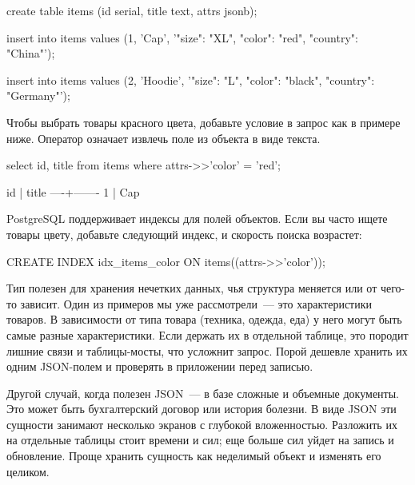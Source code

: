 \begin{english}
  \begin{sql}
create table items (id serial, title text, attrs jsonb);

insert into items values
  (1, 'Cap', '{"size": "XL", "color": "red", "country": "China"}');

insert into items values
  (2, 'Hoodie', '{"size": "L", "color": "black", "country": "Germany"}');
  \end{sql}
\end{english}

Чтобы выбрать товары красного цвета, добавьте условие в запрос как в примере ниже. Оператор \code{->>} означает извлечь поле  из объекта в виде текста.

\begin{english}
  \begin{sql}
select id, title from items where attrs->>'color' = 'red';

 id | title
----+-------
  1 | Cap
  \end{sql}
\end{english}

PostgreSQL поддерживает индексы для полей объектов. Если вы часто ищете товары цвету, добавьте следующий индекс, и скорость поиска возрастет:

\begin{english}
  \begin{clojure}
CREATE INDEX idx_items_color ON items((attrs->>'color'));
  \end{clojure}
\end{english}

Тип  полезен для хранения нечетких данных, чья структура меняется или от чего-то зависит. Один из примеров мы уже рассмотрели~--- это характеристики товаров. В зависимости от типа товара (техника, одежда, еда) у него могут быть самые разные характеристики. Если держать их в отдельной таблице, это породит лишние связи и таблицы-мосты, что усложнит запрос. Порой дешевле хранить их одним JSON-полем и проверять в приложении перед записью.

Другой случай, когда полезен JSON~--- в базе сложные и объемные документы. Это может быть бухгалтерский договор или история болезни. В виде JSON эти сущности занимают несколько экранов с глубокой вложенностью. Разложить их на отдельные таблицы стоит времени и сил; еще больше сил уйдет на запись и обновление. Проще хранить сущность как неделимый объект и изменять его целиком.


